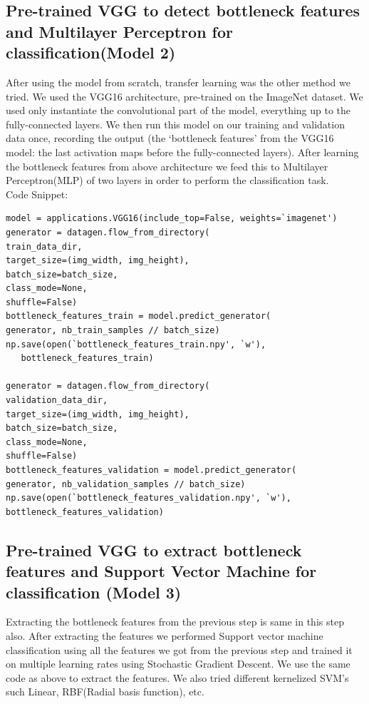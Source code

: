 \subsection{Pre-trained VGG to detect bottleneck features and  Multilayer Perceptron for classification(Model 2)}
After using the model from scratch, transfer learning\cite{b7} was the other method we tried. We used the VGG16 architecture, pre-trained on the ImageNet dataset. We used only instantiate the convolutional part of the model, everything up to the fully-connected layers. We then run this model on our training and validation data once, recording the output (the `bottleneck features' from the VGG16 model: the last activation maps before the fully-connected layers). After learning the bottleneck features from above architecture we feed this to Multilayer Perceptron(MLP) of two layers in order to perform the classification task.\\
Code Snippet:
\begin{lstlisting}[caption=Pre-trained VGG]
model = applications.VGG16(include_top=False, weights=`imagenet')
generator = datagen.flow_from_directory(
train_data_dir,
target_size=(img_width, img_height),
batch_size=batch_size,
class_mode=None,
shuffle=False)
bottleneck_features_train = model.predict_generator(
generator, nb_train_samples // batch_size)
np.save(open(`bottleneck_features_train.npy', `w'),
   bottleneck_features_train)

generator = datagen.flow_from_directory(
validation_data_dir,
target_size=(img_width, img_height),
batch_size=batch_size,
class_mode=None,
shuffle=False)
bottleneck_features_validation = model.predict_generator(
generator, nb_validation_samples // batch_size)
np.save(open(`bottleneck_features_validation.npy', `w'),
bottleneck_features_validation)
\end{lstlisting}

\subsection{Pre-trained VGG to extract bottleneck features and Support Vector Machine for classification (Model 3)}
Extracting the bottleneck features from the previous step is same in this step also. After extracting the features we performed Support vector machine classification using all the features we got from the previous step and trained it on multiple learning rates using Stochastic Gradient Descent.
We use the same code as above to extract the features. We also tried different kernelized  SVM's such Linear, RBF(Radial basis function), etc.
